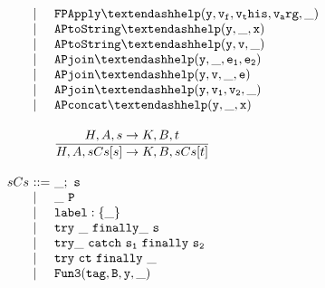 \documentclass[a4paper, leqno]{amsart}
\newcommand{\semanticrule}[2]{
	\frac{\ensuremath{\begin{matrix}#1\end{matrix}}}
		{\ensuremath{\begin{matrix}#2\end{matrix}}}
}
\newcommand{\configfromto}[6]{
	\ensuremath{#1,#2,#3 \rightarrow #4,#5,#6}
}
\begin{document}
\[\begin{array}{l@{}l@{}ll}
 & \ \mid \ & {\tt FPApply\textendash help(y,v_f,v_this,v_arg,\_)} & \\
 & \ \mid \ & {\tt APtoString\textendash help(y,\_,x)} & \\
 & \ \mid \ & {\tt APtoString\textendash help(y,v,\_)} & \\
 & \ \mid \ & {\tt APjoin\textendash help(y,\_,e_1,e_2)} & \\
 & \ \mid \ & {\tt APjoin\textendash help(y,v,\_,e)} & \\
 & \ \mid \ & {\tt APjoin\textendash help(y,v_1,v_2,\_)} & \\
 & \ \mid \ & {\tt APconcat\textendash help(y,\_,x)} & \\
 & & \\ 
 
 & &
\semanticrule
	{\configfromto
		{H}{A}{s}
		{K}{B}{t}}
	{\configfromto
		{H}{A}{sCs[s]}
		{K}{B}{sCs[t]}} &
\\ && \\ 
 
sCs & \ ::= \ & {\tt \_ ;\ s } & \\
 & \ \mid \ & {\tt \_ \ P} & \\
 & \ \mid \ & {\tt label :\{\_\}} & \\
 & \ \mid \ & {\tt try\ \_ \ finally \_ \ s} & \\
 & \ \mid \ & {\tt try \_ \ catch\ s_1\ finally\ s_2} & \\
 & \ \mid \ & {\tt try\ ct\ finally\ \_ } & \\
 & \ \mid \ & {\tt Fun3(tag,B,y,\_)} & \\
\end{array}
\]
\end{document}
